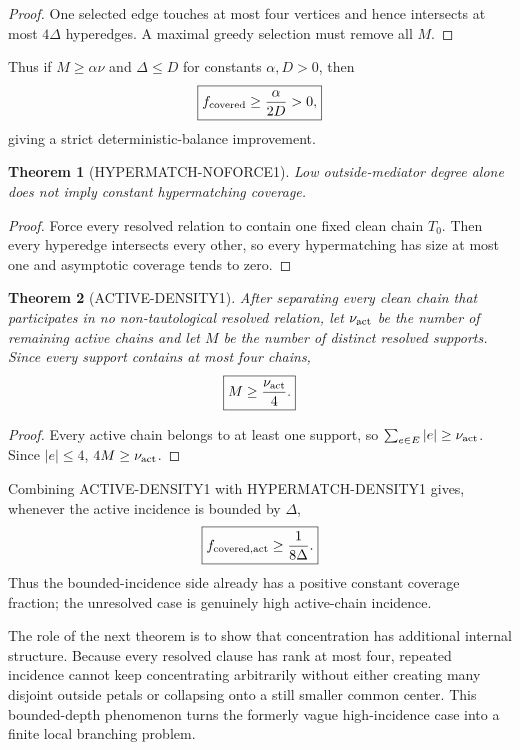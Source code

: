 \documentclass[11pt]{article}
\theoremstyle{plain}
\newtheorem{theorem}{Theorem}[section]
\theoremstyle{definition}
\theoremstyle{remark}
\begin{document}
\begin{proof}
One selected edge touches at most four vertices and hence intersects at most
$4\Delta$ hyperedges. A maximal greedy selection must remove all $M$.
\end{proof}

Thus if $M\ge\alpha\nu$ and $\Delta\le D$ for constants $\alpha,D>0$, then
\[
\boxed{
f_{\rm covered}\ge\frac{\alpha}{2D}>0,
}
\]
giving a strict deterministic-balance improvement.

\begin{theorem}[HYPERMATCH-NOFORCE1]
Low outside-mediator degree alone does not imply constant hypermatching
coverage.
\end{theorem}

\begin{proof}
Force every resolved relation to contain one fixed clean chain $T_0$. Then
every hyperedge intersects every other, so every hypermatching has size at
most one and asymptotic coverage tends to zero.
\end{proof}

\begin{theorem}[ACTIVE-DENSITY1]
After separating every clean chain that participates in no non-tautological
resolved relation, let $\nu_{\rm act}$ be the number of remaining active
chains and let $M$ be the number of distinct resolved supports. Since every
support contains at most four chains,
\[
\boxed{
M\ge \frac{\nu_{\rm act}}4.
}
\]
\end{theorem}

\begin{proof}
Every active chain belongs to at least one support, so
$\sum_{e\in E}|e|\ge\nu_{\rm act}$. Since $|e|\le4$,
$4M\ge\nu_{\rm act}$.
\end{proof}

Combining ACTIVE-DENSITY1 with HYPERMATCH-DENSITY1 gives, whenever the active
incidence is bounded by $\Delta$,
\[
\boxed{
f_{\rm covered,act}
\ge
\frac1{8\Delta}.
}
\]
Thus the bounded-incidence side already has a positive constant coverage
fraction; the unresolved case is genuinely high active-chain incidence.

The role of the next theorem is to show that concentration has additional
internal structure. Because every resolved clause has rank at most four,
repeated incidence cannot keep concentrating arbitrarily without either
creating many disjoint outside petals or collapsing onto a still smaller
common center. This bounded-depth phenomenon turns the formerly vague
high-incidence case into a finite local branching problem.
\end{document}
